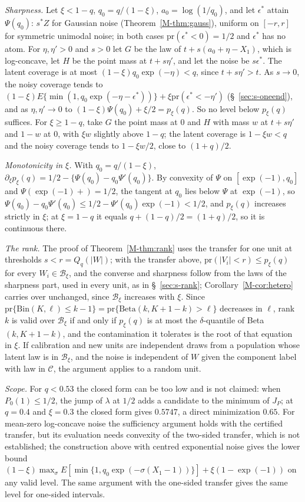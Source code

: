 \documentclass[12pt]{article}
\renewcommand{\_}{\usc\allowbreak}
\theoremstyle{definition}
\numberwithin{equation}{section}
\newcommand{\pr}{\mathrm{pr}}
\newcommand{\B}{\mathcal{B}}
\newcommand{\E}{\mathcal{C}}
\newcommand{\Bin}{\mathrm{Bin}}
\begin{document}
\emph{Sharpness.} Let $\xi < 1 - q$, $q_0 = q/(1 - \xi)$, $a_0 = \log(1/q_0)$, and let $\epsilon^*$ attain $\Psi(q_0)$: $s^*Z$ for Gaussian noise (Theorem~\ref{M-thm:gauss}), uniform on $[-r, r]$ for symmetric unimodal noise; in both cases $\pr(\epsilon^* < 0) = 1/2$ and $\epsilon^*$ has no atom. For $\eta, \eta' > 0$ and $s > 0$ let $G$ be the law of $t + s(a_0 + \eta - X_1)$, which is log-concave, let $H$ be the point mass at $t + s\eta'$, and let the noise be $s\epsilon^*$. The latent coverage is at most $(1 - \xi)q_0\exp(-\eta) < q$, since $t + s\eta' > t$. As $s \to 0$, the noisy coverage tends to $(1 - \xi)E\{\min(1, q_0\exp(-\eta - \epsilon^*))\} + \xi\pr(\epsilon^* < -\eta')$ (\S~\ref{sec:s-oneend}), and as $\eta, \eta' \to 0$ to $(1 - \xi)\Psi(q_0) + \xi/2 = p_\xi(q)$. So no level below $p_\xi(q)$ suffices. For $\xi \ge 1 - q$, take $G$ the point mass at $0$ and $H$ with mass $w$ at $t + s\eta'$ and $1 - w$ at $0$, with $\xi w$ slightly above $1 - q$; the latent coverage is $1 - \xi w < q$ and the noisy coverage tends to $1 - \xi w/2$, close to $(1 + q)/2$.

\emph{Monotonicity in $\xi$.} With $q_0 = q/(1 - \xi)$, $\partial_\xi p_\xi(q) = 1/2 - \{\Psi(q_0) - q_0\Psi'(q_0)\}$. By convexity of $\Psi$ on $[\exp(-1), q_0]$ and $\Psi(\exp(-1)+) = 1/2$, the tangent at $q_0$ lies below $\Psi$ at $\exp(-1)$, so $\Psi(q_0) - q_0\Psi'(q_0) \le 1/2 - \Psi'(q_0)\exp(-1) < 1/2$, and $p_\xi(q)$ increases strictly in $\xi$; at $\xi = 1 - q$ it equals $q + (1 - q)/2 = (1 + q)/2$, so it is continuous there.

\emph{The rank.} The proof of Theorem~\ref{M-thm:rank} uses the transfer for one unit at thresholds $s < r = Q_q(|W|)$; with the transfer above, $\pr(|V_i| < r) \le p_\xi(q)$ for every $W_i \in \B_\xi$, and the converse and sharpness follow from the laws of the sharpness part, used in every unit, as in \S~\ref{sec:s-rank}; Corollary~\ref{M-cor:hetero} carries over unchanged, since $\B_\xi$ increases with $\xi$. Since $\pr\{\Bin(K, \ell) \le k - 1\} = \pr\{\mathrm{Beta}(k, K + 1 - k) > \ell\}$ decreases in $\ell$, rank $k$ is valid over $\B_\xi$ if and only if $p_\xi(q)$ is at most the $\delta$-quantile of Beta$(k, K + 1 - k)$, and the contamination it tolerates is the root of that equation in $\xi$. If calibration and new units are independent draws from a population whose latent law is in $\B_\xi$, and the noise is independent of $W$ given the component label with law in $\E$, the argument applies to a random unit.

\emph{Scope.} For $q < 0.53$ the closed form can be too low and is not claimed: when $P_0(1) \le 1/2$, the jump of $\lambda$ at $1/2$ adds a candidate to the minimum of $J_P$; at $q = 0.4$ and $\xi = 0.3$ the closed form gives $0.5747$, a direct minimization $0.65$. For mean-zero log-concave noise the sufficiency argument holds with the certified transfer, but its evaluation needs convexity of the two-sided transfer, which is not established; the construction above with centred exponential noise gives the lower bound $(1 - \xi)\max_{\sigma}E[\min\{1, q_0\exp(-\sigma(X_1 - 1))\}] + \xi(1 - \exp(-1))$ on any valid level. The same argument with the one-sided transfer gives the same level for one-sided intervals.
\end{document}
